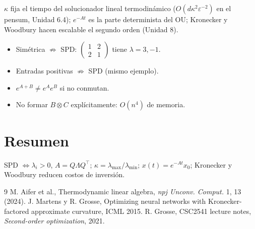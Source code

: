 \documentclass[11pt,a4paper]{article}
\begin{document}
\begin{aplicacion}
$\kappa$ fija el tiempo del solucionador lineal termodinámico ($O(d\kappa^2\varepsilon^{-2})$ en el pensum, Unidad
6.4); $e^{-At}$ es la parte determinista del OU; Kronecker y Woodbury hacen escalable el segundo orden (Unidad 8).
\end{aplicacion}

\begin{error}
\begin{itemize}[nosep]
\item Simétrica $\not\Rightarrow$ SPD: $\begin{pmatrix}1&2\\2&1\end{pmatrix}$ tiene $\lambda=3,-1$.
\item Entradas positivas $\not\Rightarrow$ SPD (mismo ejemplo).
\item $e^{A+B}\neq e^Ae^B$ si no conmutan.
\item No formar $B\otimes C$ explícitamente: $O(n^4)$ de memoria.
\end{itemize}
\end{error}

\section{Resumen}
SPD $\Leftrightarrow\lambda_i>0$, $A=Q\Lambda Q^\top$; $\kappa=\lambda_{\max}/\lambda_{\min}$; $x(t)=e^{-At}x_0$; Kronecker y
Woodbury reducen costos de inversión.

\begin{thebibliography}{9}\small
{} M. Aifer et al., Thermodynamic linear algebra, \emph{npj Unconv. Comput.} 1, 13 (2024).
 J. Martens y R. Grosse, Optimizing neural networks with Kronecker-factored approximate curvature, ICML 2015.
 R. Grosse, CSC2541 lecture notes, \emph{Second-order optimization}, 2021.
\end{thebibliography}
\end{document}
